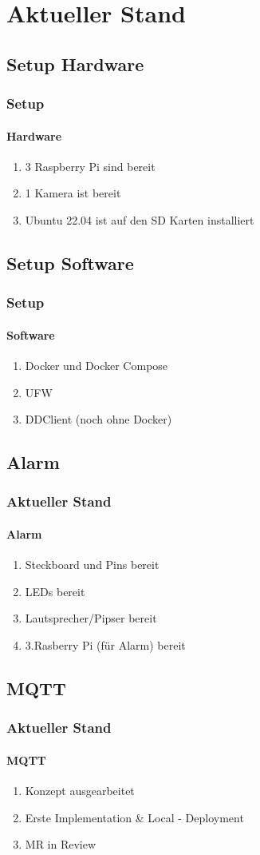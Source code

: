 \documentclass[]{beamer}
\begin{document}
\section{Aktueller Stand}
\subsection{Setup Hardware}
\begin{frame}
\frametitle{Setup}
\framesubtitle{Hardware}
\begin{enumerate}
    \item 3 Raspberry Pi sind bereit
    \item 1 Kamera ist bereit
    \item Ubuntu 22.04 ist auf den SD Karten installiert
\end{enumerate}
\end{frame}



\subsection{Setup Software}
\begin{frame}
\frametitle{Setup}
\framesubtitle{Software}

\begin{enumerate}
    \item Docker und Docker Compose
    \item UFW
    \item DDClient (noch ohne Docker)
\end{enumerate}
\end{frame}

\subsection{Alarm}
\begin{frame}
\frametitle{Aktueller Stand}
\framesubtitle{Alarm}
\begin{enumerate}
    \item Steckboard und Pins bereit
    \item LEDs bereit
    \item Lautsprecher/Pipser bereit
    \item 3.Rasberry Pi (für Alarm) bereit
\end{enumerate}
\end{frame}


\subsection{MQTT}
\begin{frame}
\frametitle{Aktueller Stand}
\framesubtitle{MQTT}
\begin{enumerate}
    \item Konzept ausgearbeitet
    \item Erste Implementation \& Local - Deployment
    \item MR in Review
\end{enumerate}
\end{frame}
\end{document}
